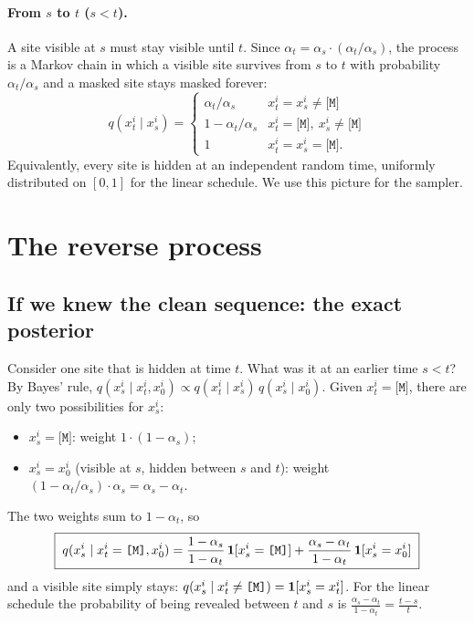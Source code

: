 \paragraph{From $s$ to $t$ ($s<t$).} A site visible at $s$ must stay visible until $t$. Since $\alpha_t=\alpha_s\cdot(\alpha_t/\alpha_s)$,
the process is a Markov chain in which a visible site survives from $s$ to $t$ with probability $\alpha_t/\alpha_s$ and a
masked site stays masked forever:
\[
q(x^i_t\mid x^i_s)=\begin{cases}\alpha_t/\alpha_s & x^i_t=x^i_s\neq\texttt{[M]}\\ 1-\alpha_t/\alpha_s & x^i_t=\texttt{[M]},\ x^i_s\neq\texttt{[M]}\\ 1 & x^i_t=x^i_s=\texttt{[M]}.\end{cases}
\]
Equivalently, every site is hidden at an independent random time, uniformly distributed on $[0,1]$ for the
linear schedule. We use this picture for the sampler.

\section{The reverse process}\label{sec:md_reverse}
\subsection{If we knew the clean sequence: the exact posterior}
Consider one site that is hidden at time $t$. What was it at an earlier time $s<t$? By Bayes' rule,
$q(x^i_s\mid x^i_t,x^i_0)\propto q(x^i_t\mid x^i_s)\,q(x^i_s\mid x^i_0)$. Given $x^i_t=\texttt{[M]}$, there are only two
possibilities for $x^i_s$:
\begin{itemize}[nosep]
\item $x^i_s=\texttt{[M]}$: weight $1\cdot(1-\alpha_s)$;
\item $x^i_s=x^i_0$ (visible at $s$, hidden between $s$ and $t$): weight $(1-\alpha_t/\alpha_s)\cdot\alpha_s=\alpha_s-\alpha_t$.
\end{itemize}
The two weights sum to $1-\alpha_t$, so
\begin{equation}\label{eq:md_posterior}
\boxed{\;q(x^i_s\mid x^i_t=\texttt{[M]},x^i_0)=\frac{1-\alpha_s}{1-\alpha_t}\,\mathbf{1}[x^i_s=\texttt{[M]}]
+\frac{\alpha_s-\alpha_t}{1-\alpha_t}\,\mathbf{1}[x^i_s=x^i_0]\;}
\end{equation}
and a visible site simply stays: $q(x^i_s\mid x^i_t\neq\texttt{[M]})=\mathbf{1}[x^i_s=x^i_t]$. For the linear schedule the
probability of being revealed between $t$ and $s$ is $\frac{\alpha_s-\alpha_t}{1-\alpha_t}=\frac{t-s}{t}$.

